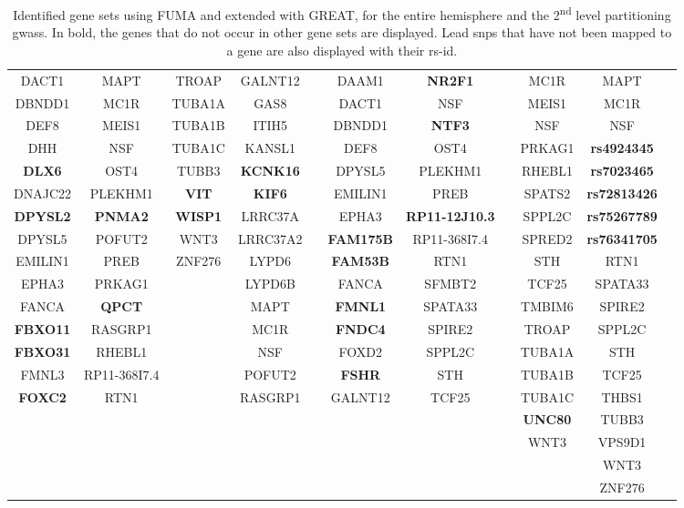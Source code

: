 \begin{table}[H]
\begin{adjustwidth}{-3 cm}{-2.5 cm}
\begin{threeparttable}
\begin{tabular}{ccc||cc||ccc||c||cc}
		DACT1 &MAPT &TROAP &GALNT12 & &DAAM1 &\textbf{NR2F1} &\textbf{} &MC1R &MAPT \\
		DBNDD1 &MC1R &TUBA1A &GAS8 & &DACT1 &NSF & &MEIS1 &MC1R \\
		DEF8 &MEIS1 &TUBA1B &ITIH5 & &DBNDD1 &\textbf{NTF3} &\textbf{} &NSF &NSF \\
		DHH &NSF &TUBA1C &KANSL1 & &DEF8 &OST4 & &PRKAG1 &\textbf{rs4924345} \\
		\textbf{DLX6} &OST4 &TUBB3 &\textbf{KCNK16} &\textbf{} &DPYSL5 &PLEKHM1 & &RHEBL1 &\textbf{rs7023465} \\
		DNAJC22 &PLEKHM1 &\textbf{VIT} &\textbf{KIF6} &\textbf{} &EMILIN1 &PREB & &SPATS2 &\textbf{rs72813426} \\
		\textbf{DPYSL2} &\textbf{PNMA2} &\textbf{WISP1} &LRRC37A & &EPHA3 &\textbf{RP11-12J10.3} &\textbf{} &SPPL2C &\textbf{rs75267789} \\
		DPYSL5 &POFUT2 &WNT3 &LRRC37A2 & &\textbf{FAM175B} &RP11-368I7.4 & &SPRED2 &\textbf{rs76341705} \\
		EMILIN1 &PREB &ZNF276 &LYPD6 & &\textbf{FAM53B} &RTN1 & &STH &RTN1 \\
		EPHA3 &PRKAG1 & &LYPD6B & &FANCA &SFMBT2 & &TCF25 &SPATA33 \\
		FANCA &\textbf{QPCT} &\textbf{} &MAPT & &\textbf{FMNL1} &SPATA33 & &TMBIM6 &SPIRE2 \\
		\textbf{FBXO11} &RASGRP1 & &MC1R & &\textbf{FNDC4} &SPIRE2 & &TROAP &SPPL2C \\
		\textbf{FBXO31} &RHEBL1 & &NSF & &FOXD2 &SPPL2C & &TUBA1A &STH \\
		FMNL3 &RP11-368I7.4 & &POFUT2 & &\textbf{FSHR} &STH & &TUBA1B &TCF25 \\
		\textbf{FOXC2} &RTN1 & &RASGRP1 & &GALNT12 &TCF25 & &TUBA1C &THBS1 \\
		& & & & & & & &\textbf{UNC80} &TUBB3 \\
		& & & & & & & &WNT3 &VPS9D1 \\
		& & & & & & &\textbf{} & &WNT3 \\
		& & & & & & & & &ZNF276 \\
		\bottomrule
	\end{tabular}

\end{threeparttable}
\end{adjustwidth}
	\caption[Identified gene sets]{Identified gene sets using FUMA and extended with GREAT, for the entire hemisphere and the 2\textsuperscript{nd} level partitioning \acp{gwas}. In bold, the genes that do not occur in other gene sets are displayed. Lead \acp{snp} that have not been mapped to a gene are also displayed with their rs-id.}
\label{tab:genesets}
\end{table}

